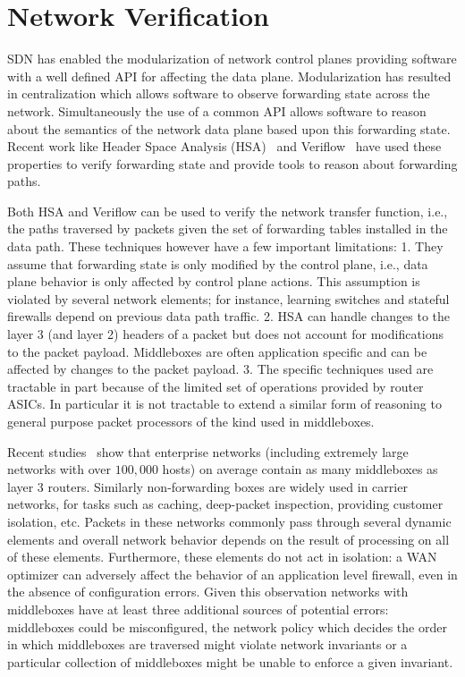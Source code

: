 \documentclass[letterpaper]{article}
\begin{document}
\section*{Network Verification}
SDN has enabled the modularization of network control planes providing software with a well defined API for
affecting the data plane. Modularization has resulted in centralization which allows software to observe
forwarding state across the network. Simultaneously the use of a common API allows software to reason about
the semantics of the network data plane based upon this forwarding state. Recent work like Header Space
Analysis (HSA)~\cite{kazemian2012header} and Veriflow~\cite{khurshid13veriflow} have used these properties to
verify forwarding state and provide tools to reason about forwarding paths. 

Both HSA and Veriflow can be used to verify the network transfer function, i.e., the paths traversed by
packets given the set of forwarding tables installed in the data path. These techniques however have a few
important limitations: 1. They assume that forwarding state is only modified by the control plane, i.e.,
data plane behavior is only affected by control plane actions. This assumption is violated by several network
elements; for instance, learning switches and stateful firewalls depend on previous data path traffic. 2.
HSA can handle changes to the layer 3 (and layer 2) headers of a packet but does not account for modifications to the
packet payload. Middleboxes are often application specific and can be affected by changes to the packet
payload. 3. The specific techniques used are tractable in part because of the limited set of operations provided by
router ASICs. In particular it is not tractable to extend a similar form of reasoning to general purpose
packet processors of the kind used in middleboxes.

Recent studies~\cite{sherry2012making} show that enterprise networks (including extremely large networks with
over $100,000$ hosts) on average contain as many middleboxes as layer 3 routers. Similarly non-forwarding
boxes are widely used in carrier networks, for tasks such as caching, deep-packet inspection, providing
customer isolation, etc. Packets in these networks commonly pass through several dynamic elements and overall
network behavior depends on the result of processing on all of these elements. Furthermore, these elements do
not act in isolation: a WAN optimizer can adversely affect the behavior of an application level firewall, even
in the absence of configuration errors. Given this observation networks with middleboxes have at least three
additional sources of potential errors: middleboxes could be misconfigured, the network policy which decides
the order in which middleboxes are traversed might violate network invariants or a particular collection of
middleboxes might be unable to enforce a given invariant.
\end{document}
